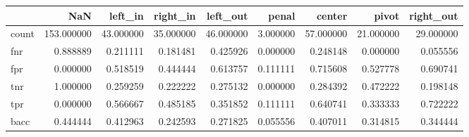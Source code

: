 \begin{tabular}{lrrrrrrrr}
\toprule
{} &         NaN &    left\_in &   right\_in &   left\_out &     penal &     center &      pivot &  right\_out \\
\midrule
count &  153.000000 &  43.000000 &  35.000000 &  46.000000 &  3.000000 &  57.000000 &  21.000000 &  29.000000 \\
fnr   &    0.888889 &   0.211111 &   0.181481 &   0.425926 &  0.000000 &   0.248148 &   0.000000 &   0.055556 \\
fpr   &    0.000000 &   0.518519 &   0.444444 &   0.613757 &  0.111111 &   0.715608 &   0.527778 &   0.690741 \\
tnr   &    1.000000 &   0.259259 &   0.222222 &   0.275132 &  0.000000 &   0.284392 &   0.472222 &   0.198148 \\
tpr   &    0.000000 &   0.566667 &   0.485185 &   0.351852 &  0.111111 &   0.640741 &   0.333333 &   0.722222 \\
bacc  &    0.444444 &   0.412963 &   0.242593 &   0.271825 &  0.055556 &   0.407011 &   0.314815 &   0.344444 \\
\bottomrule
\end{tabular}
